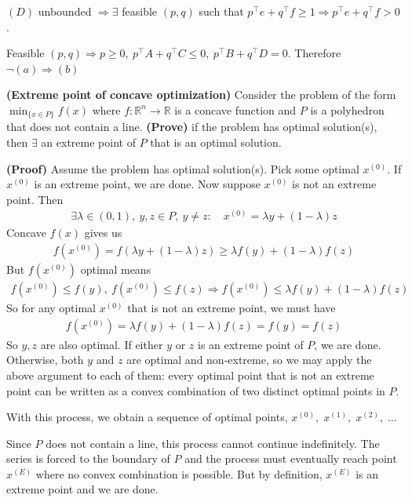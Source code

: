 \documentclass[11pt]{exam}
\begin{document}
\begin{questions}
    $(D)$ unbounded $\Longrightarrow \exists$ feasible $(p,q)$ such that $p^\top e + q^\top f \geq 1 \Longrightarrow p^\top e + q^\top f > 0$. 
    
    Feasible $(p,q) \Longrightarrow p\geq 0,\ p^\top A + q^\top C \leq 0,\ p^\top B + q^\top D = 0$. Therefore $\neg (a) \Rightarrow (b)$



    \question \textbf{(Extreme point of concave optimization)} Consider the problem of the form $\min_{\{x\in P \}} f(x)$ where $f: \mathbb R^n \to \mathbb R$ is a concave function and $P$ is a polyhedron that does not contain a line. \textbf{(Prove)} if the problem has optimal solution(s), then $\exists$ an extreme point of $P$ that is an optimal solution.
    
    \textbf{(Proof)} Assume the problem has optimal solution(s). Pick some optimal $x^{(0)}$. If $x^{(0)}$ is an extreme point, we are done. Now suppose $x^{(0)}$ is not an extreme point. Then
    \begin{align*}
        \exists \lambda \in (0,1),\ y,z\in P,\ y\neq z:\quad x^{(0)} = \lambda y + (1-\lambda)z
    \end{align*}
    Concave $f(x)$ gives us
    \begin{align*}
        f(x^{(0)}) = f(\lambda y + (1-\lambda)z) \geq \lambda f(y) + (1-\lambda)f(z)
    \end{align*}
    But $f(x^{(0)})$ optimal means
    \begin{align*}
        f(x^{(0)}) \leq f(y),\ f(x^{(0)})\leq f(z) \Longrightarrow f(x^{(0)}) \leq \lambda f(y) + (1-\lambda)f(z)
    \end{align*}
    So for any optimal $x^{(0)}$ that is not an extreme point, we must have
    \begin{align*}
        f(x^{(0)}) = \lambda f(y) + (1-\lambda)f(z) = f(y) = f(z)
    \end{align*}
    So $y,z$ are also optimal. If either $y$ or $z$ is an extreme point of $P$, we are done.
    Otherwise, both $y$ and $z$ are optimal and non-extreme, so we may apply the above argument to each of them: every optimal point that is not an extreme point can be written as a convex combination of two distinct optimal points in $P$.
    
    With this process, we obtain a sequence of optimal points, $x^{(0)},\; x^{(1)},\; x^{(2)},\;\dots$

    Since $P$ does not contain a line, this process cannot continue indefinitely. The series is forced to the boundary of $P$ and the process must eventually reach point $x^{(E)}$ where no convex combination is possible. But by definition, $x^{(E)}$ is an extreme point and we are done. 






\end{questions}
\end{document}
